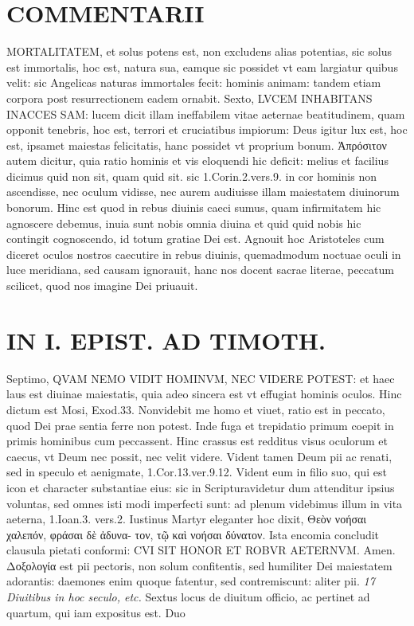 \documentclass{article}
\begin{document}
\begin{pages}
\section*{COMMENTARII }
\marginpar{[ p.166 ]}\pstart MORTALITATEM, et solus potens est, non excludens alias potentias, sic solus est immortalis, hoc est, natura sua, eamque sic possidet vt eam largiatur quibus velit: sic Angelicas naturas immortales fecit: hominis animam: tandem etiam corpora post resurrectionem eadem ornabit.  \pend\pstart Sexto, LVCEM INHABITANS INACCES SAM: lucem dicit illam ineffabilem vitae aeternae beatitudinem, quam opponit tenebris, hoc est, terrori et cruciatibus impiorum: Deus igitur lux est, hoc est, ipsamet maiestas felicitatis, hanc possidet vt proprium bonum. Ἀπρόσιτον autem dicitur, quia ratio hominis et vis eloquendi hic deficit: melius et facilius dicimus quid non sit, quam quid sit. sic 1.Corin.2.vers.9. in cor hominis non ascendisse, nec oculum vidisse, nec aurem audiuisse illam maiestatem diuinorum bonorum. Hinc est quod in rebus diuinis caeci sumus, quam infirmitatem hic agnoscere debemus, inuia sunt nobis omnia diuina et quid quid nobis hic contingit cognoscendo, id totum gratiae Dei est. Agnouit hoc Aristoteles cum diceret oculos nostros caecutire in rebus diuinis, quemadmodum noctuae oculi in luce meridiana, sed causam ignorauit, hanc nos docent sacrae literae, peccatum scilicet, quod nos imagine Dei priuauit.  \pend
\section*{IN I. EPIST. AD TIMOTH. }
\marginpar{[ p.167 ]}\pstart Septimo, QVAM NEMO VIDIT HOMINVM, NEC VIDERE POTEST: et haec laus est diuinae maiestatis, quia adeo sincera est vt effugiat hominis oculos. Hinc dictum est Mosi, Exod.33. Nonvidebit me homo et viuet, ratio est in peccato, quod Dei prae sentia ferre non potest. Inde fuga et trepidatio primum coepit in primis hominibus cum peccassent. Hinc crassus est redditus visus oculorum et caecus, vt Deum nec possit, nec velit videre. Vident tamen Deum pii ac renati, sed in speculo et aenigmate, 1.Cor.13.ver.9.12. Vident eum in filio suo, qui est icon et character substantiae eius: sic in Scripturavidetur dum attenditur ipsius voluntas, sed omnes isti modi imperfecti sunt: ad plenum videbimus illum in vita aeterna, 1.Ioan.3. vers.2. Iustinus Martyr eleganter hoc dixit, Θεὸν νοήσαι χαλεπόν, φράσαι δὲ ἀδυνα- τον, τῷ καὶ νοήσαι δύνατον. Ista encomia concludit clausula pietati conformi: CVI SIT HONOR ET ROBVR AETERNVM. Amen. Δοξολογία est pii pectoris, non solum confitentis, sed humiliter Dei maiestatem adorantis: daemones enim quoque fatentur, sed contremiscunt: aliter pii.  \pend
\textit{17 Diuitibus in hoc seculo, etc. }\pstart Sextus locus de diuitum officio, ac pertinet ad quartum, qui iam expositus est. Duo  \pend

\end{pages}
\end{document}

